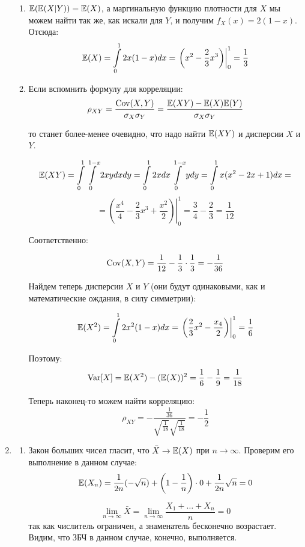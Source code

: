 \documentclass[12pt, a4paper]{article}\usepackage[]{graphicx}\usepackage[]{color}
\begin{document}
\begin{enumerate}
\begin{enumerate}
\item $\mathbb{E}(\mathbb{E}(X|Y)) = \mathbb{E}(X)$, а маргинальную функцию плотности для $X$ мы можем найти так же, как искали для $Y$, и получим $f_X(x) = 2(1-x)$. Отсюда:
\[
\mathbb{E}(X) = \int \limits_{0}^{1} 2x(1-x)dx = \left .\left(x^2 - \frac{2}{3}x^3\right) \right|^{1}_{0} = \frac{1}{3}
\]

\item Если вспомнить формулу для корреляции:
\[
\rho_{XY} = \frac{\operatorname{Cov}(X, Y)}{\sigma_X\sigma_Y}  = \frac{\mathbb{E}(XY) - \mathbb{E}(X)\mathbb{E}(Y)}{\sigma_X\sigma_Y}
\]

то станет более-менее очевидно, что надо найти $\mathbb{E}(XY)$ и дисперсии $X$ и $Y$.

\[
\mathbb{E}(XY) = \int \limits_{0}^{1} \int \limits_{0}^{1-x} 2xy dxdy = \int \limits_{0}^{1} 2xdx \int \limits_{0}^{1-x}ydy =  \int \limits_{0}^{1}x(x^2-2x+1)dx =
\]
\[
= \left. \left(\frac{x^4}{4} - \frac{2}{3}x^3 + \frac{x^2}{2}\right) \right|^{1}_{0} = \frac{3}{4}-\frac{2}{3} = \frac{1}{12}
\]

Соответственно:

\[
\operatorname{Cov}(X, Y) = \frac{1}{12} - \frac{1}{3}\cdot \frac{1}{3} = -\frac{1}{36}
\]

Найдем теперь дисперсии $X$ и $Y$ (они будут одинаковыми, как и математические ождания, в силу симметрии):

\[
\mathbb{E}(X^2) = \int \limits_{0}^{1} 2x^2(1-x)dx = \left. \left( \frac{2}{3}x^2 - \frac{x_4}{2} \right) \right|_{0}^{1} = \frac{1}{6}
\]

Поэтому:
\[
\operatorname{Var}[X] = \mathbb{E}(X^2) - (\mathbb{E}(X))^2 = \frac{1}{6} - \frac{1}{9} = \frac{1}{18}
\]

Теперь наконец-то можем найти корреляцию:
\[
\rho_{XY} = -\frac{\frac{1}{36}}{\sqrt{\frac{1}{18}}\sqrt{\frac{1}{18}}} = -\frac{1}{2}
\]
\end{enumerate}

\item

\begin{enumerate}

\item Закон больших чисел гласит, что $\bar{X} \rightarrow
\mathbb{E}(X)$ при $n\rightarrow \infty$. Проверим его выполнение в данном случае:
\[
\mathbb{E}(X_n) = \frac{1}{2n}(-\sqrt{n}) + \left(1-\frac{1}{n}\right)\cdot0 + \frac{1}{2n}\sqrt{n} = 0
\]

\[
\lim\limits_{n\rightarrow\infty} \bar{X} = \lim\limits_{n\rightarrow\infty} \frac{X_1 +\dots + X_n}{n} = 0
\]
так как числитель ограничен, а знаменатель бесконечно возрастает.
Видим, что ЗБЧ в данном случае, конечно, выполняется.


\end{enumerate}
\end{enumerate}
\end{document}
